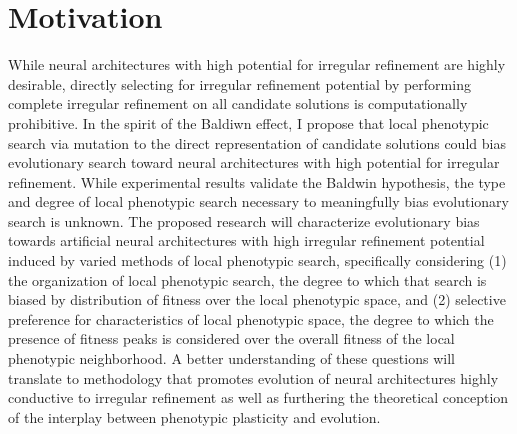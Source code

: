 \section{Motivation}

While neural architectures with high potential for irregular refinement are highly desirable, directly selecting for irregular refinement potential by performing complete irregular refinement on all candidate solutions is computationally prohibitive. In the spirit of the Baldiwn effect, I propose that local phenotypic search via mutation to the direct representation of candidate solutions could bias evolutionary search toward neural architectures with high potential for irregular refinement. While experimental results validate the Baldwin hypothesis,\autocite{Downing2009ComputationalEffect} the type and degree of local phenotypic search necessary to meaningfully bias evolutionary search is unknown. The proposed research will characterize evolutionary bias towards artificial neural architectures with high irregular refinement potential induced by varied methods of local phenotypic search, specifically considering (1) the organization of local phenotypic search, the degree to which that search is biased by distribution of fitness over the local phenotypic space, and (2) selective preference for characteristics of local phenotypic space, the degree to which the presence of fitness peaks is considered over the overall fitness of the local phenotypic neighborhood. A better understanding of these questions will translate to methodology that promotes evolution of neural architectures highly conductive to irregular refinement as well as furthering the theoretical conception of the interplay between phenotypic plasticity and evolution. 